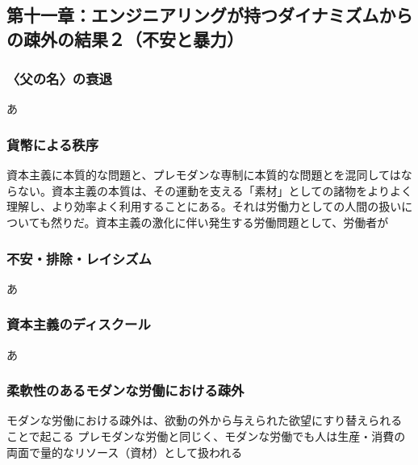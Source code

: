 \subsection{第十一章：エンジニアリングが持つダイナミズムからの疎外の結果２（不安と暴力）}\label{ux7b2cux5341ux4e00ux7ae0ux30a8ux30f3ux30b8ux30cbux30a2ux30eaux30f3ux30b0ux304cux6301ux3064ux30c0ux30a4ux30caux30dfux30baux30e0ux304bux3089ux306eux758eux5916ux306eux7d50ux679cuxff12ux4e0dux5b89ux3068ux66b4ux529b}

\subsubsection{〈父の名〉の衰退}\label{ux7236ux306eux540dux306eux8870ux9000}

あ

\subsubsection{貨幣による秩序}\label{ux8ca8ux5e63ux306bux3088ux308bux79e9ux5e8f}

資本主義に本質的な問題と、プレモダンな専制に本質的な問題とを混同してはならない。資本主義の本質は、その運動を支える「素材」としての諸物をよりよく理解し、より効率よく利用することにある。それは労働力としての人間の扱いについても然りだ。資本主義の激化に伴い発生する労働問題として、労働者が

\subsubsection{不安・排除・レイシズム}\label{ux4e0dux5b89ux6392ux9664ux30ecux30a4ux30b7ux30baux30e0}

あ

\subsubsection{資本主義のディスクール}\label{ux8cc7ux672cux4e3bux7fa9ux306eux30c7ux30a3ux30b9ux30afux30fcux30eb}

あ

\subsubsection{柔軟性のあるモダンな労働における疎外}\label{ux67d4ux8edfux6027ux306eux3042ux308bux30e2ux30c0ux30f3ux306aux52b4ux50cdux306bux304aux3051ux308bux758eux5916}

モダンな労働における疎外は、欲動の外から与えられた欲望にすり替えられることで起こる
プレモダンな労働と同じく、モダンな労働でも人は生産・消費の両面で量的なリソース（資材）として扱われる

